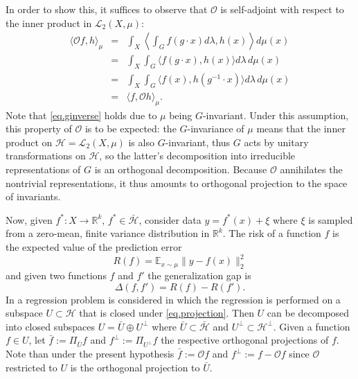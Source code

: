 \documentclass[twoside,11pt]{article}
\begin{document}
In order to show this, it suffices to observe that $\mathcal 
O$ is self-adjoint with respect to the inner product in $\mathscr L_2(X, \mu)$:
\begin{eqnarray}
 \langle \mathcal O f, h \rangle_\mu &=& \int_X \left\langle \int_G f(g\cdot x) d\lambda , h(x) \right \rangle d\mu(x) \label{eq.sa1}\\
&=& \int_X \int_G \langle  f(g\cdot x) , h(x) \rangle  d\lambda \, d\mu(x) \\
&=& \int_X \int_G \langle  f( x) , h(g^{-1}\cdot x) \rangle  d\lambda \, d\mu(x) \label{eq.ginverse}\\
&=& \langle f,  \mathcal O h \rangle_\mu. \label{eq.sa4}
\end{eqnarray}
Note that \eqref{eq.ginverse} holds due to $\mu$ being $G$-invariant. Under this assumption, this property of $\mathcal O$ is to be expected:  the $G$-invariance of $\mu$ means that the inner product on $\mathcal H = \mathscr L_2(X,\mu)$ is also $G$-invariant, thus $G$ acts by unitary transformations on $\mathcal H$, so the latter's decomposition into irreducible representations of $G$ is an orthogonal decomposition. Because $\mathcal O$ annihilates the nontrivial representations, it thus amounts to orthogonal projection to the space of invariants.


Now, given $f^*:X \to \mathbb R^k$, 
$f^*\in \bar{ \mathcal H}$, \citet{elesedy2021provably} consider data $y=f^*(x)+\xi$ where $\xi$ is sampled from a zero-mean, finite variance distribution in $\mathbb R^k$. 
The risk of a function $f$ is the expected value of the prediction error
\begin{equation} \label{eq.risk}
     R(f) = \mathbb E_{x\sim \mu} \|y - f(x)\|_2^2
\end{equation}
and given two functions $f$ and $f'$ the generalization gap is
\begin{equation}
    \Delta(f, f')= R(f)-R(f'). 
\end{equation}
In \citet{elesedy2021provably} a regression problem is considered in which the regression is performed on a subspace $U \subset \mathcal H$ that is closed under \eqref{eq.projection}. Then $U$ can be decomposed into closed subspaces $U = \bar U \oplus U^\perp$ where $\bar U \subset \bar{ \mathcal H}$ and $U^\perp \subset \mathcal H^\perp$. Given a function $f\in U$, let $\bar f:=\Pi_{\bar U}f$ and $f^\perp:=\Pi_{U^\perp}f$ the respective orthogonal projections of $f$. 
Note than under the present hypothesis $\bar f := \mathcal O f$ and $f^\perp := f - \mathcal O f$ since $\mathcal O$ restricted to $U$ is  the orthogonal projection to $\bar U$.
\end{document}
